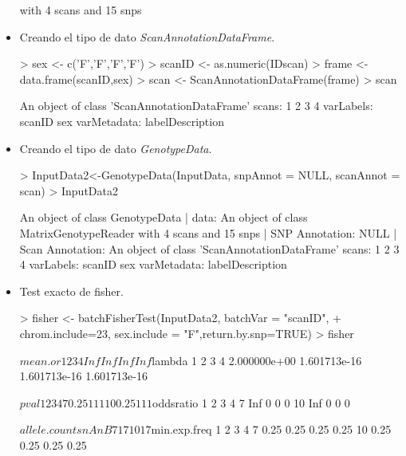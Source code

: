 \documentclass[12pt]{article}
\begin{document}
\begin{itemize}
\begin{Schunk}
\begin{Soutput}
with 4 scans and 15 snps
\end{Soutput}
\end{Schunk}
\item Creando el tipo de dato \textit{ScanAnnotationDataFrame}.
\begin{Schunk}
\begin{Sinput}
> sex <- c('F','F','F','F')
> scanID <- as.numeric(IDscan)
> frame <- data.frame(scanID,sex)
> scan <- ScanAnnotationDataFrame(frame)
> scan
\end{Sinput}
\begin{Soutput}
An object of class 'ScanAnnotationDataFrame'
  scans: 1 2 3 4
  varLabels: scanID sex
  varMetadata: labelDescription
\end{Soutput}
\end{Schunk}
\item Creando el tipo de dato \textit{GenotypeData}.
\begin{Schunk}
\begin{Sinput}
> InputData2<-GenotypeData(InputData, snpAnnot = NULL, scanAnnot = scan)
> InputData2
\end{Sinput}
\begin{Soutput}
An object of class GenotypeData 
 | data:
An object of class MatrixGenotypeReader 
with 4 scans and 15 snps
 | SNP Annotation:
NULL
 | Scan Annotation:
An object of class 'ScanAnnotationDataFrame'
  scans: 1 2 3 4
  varLabels: scanID sex
  varMetadata: labelDescription
\end{Soutput}
\end{Schunk}
\item Test exacto de fisher.
\begin{Schunk}
\begin{Sinput}
> fisher <- batchFisherTest(InputData2, batchVar = "scanID",
+                           chrom.include=23, sex.include = "F",return.by.snp=TRUE)
> fisher
\end{Sinput}
\begin{Soutput}
$mean.or
  1   2   3   4 
Inf Inf Inf Inf 

$lambda
           1            2            3            4 
2.000000e+00 1.601713e-16 1.601713e-16 1.601713e-16 

$pval
      1 2 3 4
7  0.25 1 1 1
10 0.25 1 1 1

$oddsratio
     1 2 3 4
7  Inf 0 0 0
10 Inf 0 0 0

$allele.counts
   nA nB
7   1  7
10  1  7

$min.exp.freq
      1    2    3    4
7  0.25 0.25 0.25 0.25
10 0.25 0.25 0.25 0.25
\end{Soutput}
\end{Schunk}
\end{itemize}
\end{document}
